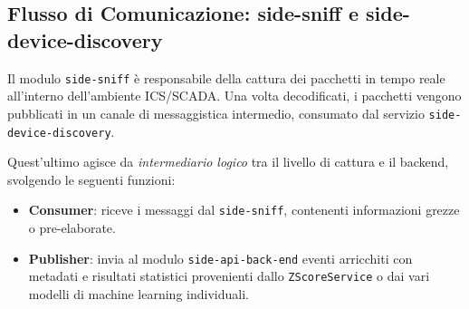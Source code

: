 \subsection{Flusso di Comunicazione: side-sniff e side-device-discovery}

Il modulo \texttt{side-sniff} è responsabile della cattura dei pacchetti in tempo reale all’interno dell’ambiente ICS/SCADA.  
Una volta decodificati, i pacchetti vengono pubblicati in un canale di messaggistica intermedio, consumato dal servizio \texttt{side-device-discovery}.  

Quest’ultimo agisce da \textit{intermediario logico} tra il livello di cattura e il backend, svolgendo le seguenti funzioni:
\begin{itemize}
    \item \textbf{Consumer}: riceve i messaggi dal \texttt{side-sniff}, contenenti informazioni grezze o pre-elaborate.
    \item \textbf{Publisher}: invia al modulo \texttt{side-api-back-end} eventi arricchiti con metadati e risultati statistici provenienti dallo \texttt{ZScoreService} o dai vari modelli di machine learning individuali.
\end{itemize}

